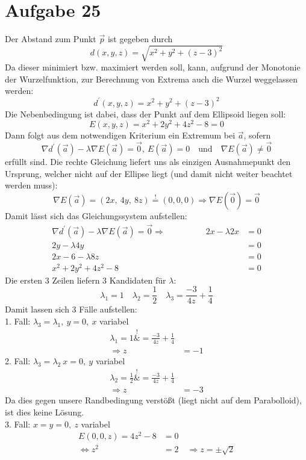 \documentclass[10pt]{article}
\begin{document}
\thispagestyle{fancy}
\section*{Aufgabe 25}
Der Abstand zum Punkt $\vec p$ ist gegeben durch
\[ d(x,y,z) = \sqrt{x^2 + y^2 + (z-3)^2} \]
Da dieser minimiert bzw. maximiert werden soll, kann, aufgrund der Monotonie der Wurzelfunktion, zur Berechnung
von Extrema auch die Wurzel weggelassen werden:
\[ d^\prime (x,y,z) = x^2 + y^2 + (z-3)^2 \]
Die Nebenbedingung ist dabei, dass der Punkt auf dem Ellipsoid liegen soll:
\[ E(x,y,z) = x^2 + 2y^2 + 4z^2 - 8 = 0 \]
Dann folgt aus dem notwendigen Kriterium ein Extremum bei $\vec a$, sofern
\[ \nabla d^\prime(\vec a) - \lambda \nabla E(\vec a) = \vec 0, \ E(\vec a) = 0 \quad 
\text{und} \quad \nabla E (\vec a) \neq \vec 0 \]
erfüllt sind.
Die rechte Gleichung liefert uns als einzigen Ausnahmepunkt den Ursprung, welcher nicht auf der Ellipse liegt
(und damit nicht weiter beachtet werden muss):
\[ \nabla E (\vec a) = (2x, \ 4y, \ 8z) \overset!= (0,0,0) \Rightarrow \nabla E(\vec 0) = \vec 0 \]
Damit lässt sich das Gleichungssystem aufstellen:
\begin{align*}
	\nabla d^\prime(\vec a) - \lambda \nabla E(\vec a) = \vec 0
	\Rightarrow \hspace{2cm}
	2x - \lambda 2x &= 0 \\
	2y - \lambda 4y &= 0 \\
	2x - 6 - \lambda 8z &= 0 \\
	x^2 + 2y^2 + 4z^2 - 8 &= 0
\end{align*}
Die ersten 3 Zeilen liefern 3 Kandidaten für $\lambda$:
\[
	\lambda_1 = 1 \quad
	\lambda_2 = \frac12 \quad
	\lambda_3 = \frac{-3}{4z} + \frac14
\]
Damit lassen sich 3 Fälle aufstellen:\\
1. Fall: $\lambda_3 = \lambda_1, \ y = 0, \ x$ variabel
\begin{align*}
	\lambda_1 = 1 \overset{!}&{=} \frac{-3}{4z} + \frac14 \\
	\Rightarrow z &= -1
\end{align*}
2. Fall: $\lambda_3 = \lambda_2 \ x = 0, \ y$ variabel
\begin{align*}
	\lambda_2 = \frac12 \overset{!}&{=} \frac{-3}{4z} + \frac14 \\
	\Rightarrow z &= -3
\end{align*}
Da dies gegen unsere Randbedingung verstößt (liegt nicht auf dem Parabolloid), ist dies keine Lösung. \\
3. Fall: $x = y = 0, \ z$ variabel
\begin{align*}
	E(0,0,z) = 4z^2 - 8 &= 0 \\
	\Leftrightarrow 
	z^2 &= 2 \quad \Rightarrow z = \pm \sqrt 2
\end{align*}
\end{document}
